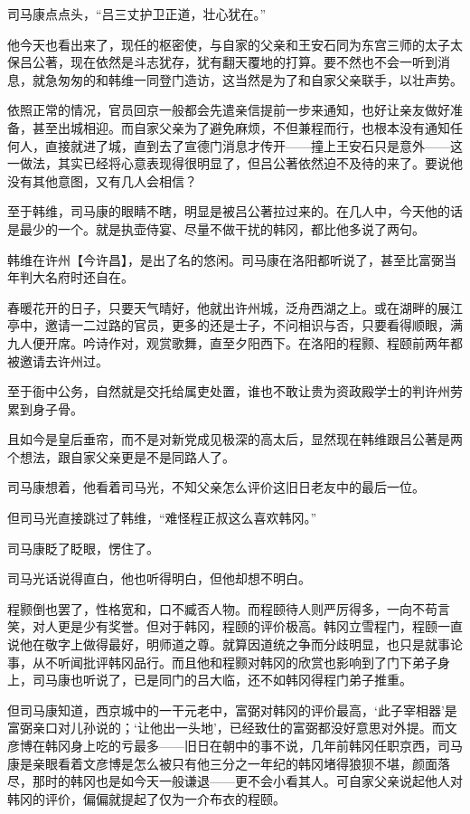司马康点点头，“吕三丈护卫正道，壮心犹在。”

他今天也看出来了，现任的枢密使，与自家的父亲和王安石同为东宫三师的太子太保吕公著，现在依然是斗志犹存，犹有翻天覆地的打算。要不然也不会一听到消息，就急匆匆的和韩维一同登门造访，这当然是为了和自家父亲联手，以壮声势。

依照正常的情况，官员回京一般都会先遣亲信提前一步来通知，也好让亲友做好准备，甚至出城相迎。而自家父亲为了避免麻烦，不但兼程而行，也根本没有通知任何人，直接就进了城，直到去了宣德门消息才传开——撞上王安石只是意外——这一做法，其实已经将心意表现得很明显了，但吕公著依然迫不及待的来了。要说他没有其他意图，又有几人会相信？

至于韩维，司马康的眼睛不瞎，明显是被吕公著拉过来的。在几人中，今天他的话是最少的一个。就是执壶侍宴、尽量不做干扰的韩冈，都比他多说了两句。

韩维在许州【今许昌】，是出了名的悠闲。司马康在洛阳都听说了，甚至比富弼当年判大名府时还自在。

春暖花开的日子，只要天气晴好，他就出许州城，泛舟西湖之上。或在湖畔的展江亭中，邀请一二过路的官员，更多的还是士子，不问相识与否，只要看得顺眼，满九人便开席。吟诗作对，观赏歌舞，直至夕阳西下。在洛阳的程颢、程颐前两年都被邀请去许州过。

至于衙中公务，自然就是交托给属吏处置，谁也不敢让贵为资政殿学士的判许州劳累到身子骨。

且如今是皇后垂帘，而不是对新党成见极深的高太后，显然现在韩维跟吕公著是两个想法，跟自家父亲更是不是同路人了。

司马康想着，他看着司马光，不知父亲怎么评价这旧日老友中的最后一位。

但司马光直接跳过了韩维，“难怪程正叔这么喜欢韩冈。”

司马康眨了眨眼，愣住了。

司马光话说得直白，他也听得明白，但他却想不明白。

程颢倒也罢了，性格宽和，口不臧否人物。而程颐待人则严厉得多，一向不苟言笑，对人更是少有奖誉。但对于韩冈，程颐的评价极高。韩冈立雪程门，程颐一直说他在敬字上做得最好，明师道之尊。就算因道统之争而分歧明显，也只是就事论事，从不听闻批评韩冈品行。而且他和程颢对韩冈的欣赏也影响到了门下弟子身上，司马康也听说了，已是同门的吕大临，还不如韩冈得程门弟子推重。


但司马康知道，西京城中的一干元老中，富弼对韩冈的评价最高，‘此子宰相器’是富弼亲口对儿孙说的；‘让他出一头地’，已经致仕的富弼都没好意思对外提。而文彦博在韩冈身上吃的亏最多——旧日在朝中的事不说，几年前韩冈任职京西，司马康是亲眼看着文彦博是怎么被只有他三分之一年纪的韩冈堵得狼狈不堪，颜面落尽，那时的韩冈也是如今天一般谦退——更不会小看其人。可自家父亲说起他人对韩冈的评价，偏偏就提起了仅为一介布衣的程颐。

